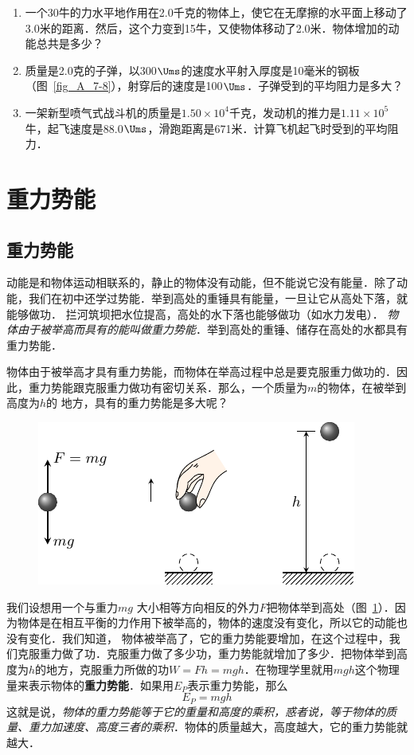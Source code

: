 \begin{enumerate}
    \item 一个30牛的力水平地作用在2.0千克的物体上，使它在无摩擦的水平面上移动了3.0米的距离．然后，这个力变到15牛，又使物体移动了2.0米．物体增加的动能总共是多少？
\item 质量是2.0克的子弹，以300$\Ums$的速度水平射入厚度是10毫米的钢板（图~\ref{fig_A_7-8}），射穿后的速度是100$\Ums$．子弹受到的平均阻力是多大？

\item 一架新型喷气式战斗机的质量是$1.50\times 10^4$千克，发动机的推力是$1.11\times 10^5$牛，起飞速度是88.0$\Ums$，滑跑距离是671米．计算飞机起飞时受到的平均阻力．
    \end{enumerate}

   \section{重力势能}

   \subsection{重力势能}
   
   动能是和物体运动相联系的，静止的物体没有动能，但不能说它没有能量．除了动能，我们在初中还学过势能．举到高处的重锤具有能量，一旦让它从高处下落，就能够做功．
   拦河筑坝把水位提高，高处的水下落也能够做功（如水力发电）．
   \textit{物体由于被举高而具有的能叫做重力势能}．举到高处的重锤、储存在高处的水都具有重力势能．

    物体由于被举高才具有重力势能，而物体在举高过程中总是要克服重力做功的．因此，重力势能跟克服重力做功有密切关系．那么，一个质量为$m$的物体，在被举到高度为$h$的
    地方，具有的重力势能是多大呢？

\begin{figure}[htbp]
    \centering
    \includegraphics{fig/A/7-9.pdf}
    \caption{}\label{fig_A_7-9}
\end{figure}

    我们设想用一个与重力$mg$
    大小相等方向相反的外力$F$把物体举到高处（图~\ref{fig_A_7-9}）．因为物体是在相互平衡的力作用下被举高的，物体的速度没有变化，所以它的动能也没有变化．我们知道，
物体被举高了，它的重力势能要增加，在这个过程中，我们克服重力做了功．克服重力做了多少功，重力势能就增加了多少．把物体举到高度为$h$的地方，克服重力所做的功$W=Fh=mgh$．在物理学里就用$mgh$这个物理量来表示物体的\textbf{重力势能}．如果用$E_P$表示重力势能，那么
\[E_P =mgh\]
这就是说，\textit{物体的重力势能等于它的重量和高度的乘积，惑者说，等于物体的质量、重力加速度、高度三者的乘积}．物体的质量越大，高度越大，它的重力势能就越大．

